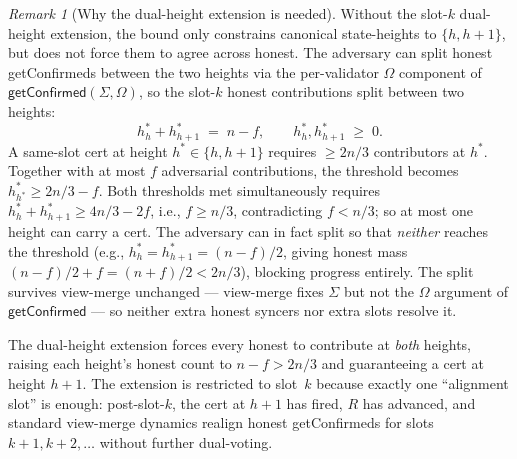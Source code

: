 \ifx\litemode\undefined\documentclass{article}\fi
\newcommand{\getConfirmed}{\textsf{getConfirmed}\xspace}
\theoremstyle{plain}
\theoremstyle{definition}
\theoremstyle{remark}
\newtheorem{remark}[theorem]{Remark}
\begin{document}
\begin{remark}[Why the dual-height extension is needed]\label{rev:rem:dual-vote-needed}
Without the slot-$k$ dual-height extension, the  bound only constrains canonical state-heights to $\{h, h+1\}$, but does not force them to agree across honest. The adversary can split honest \getConfirmed{}s between the two heights via the per-validator $\Omega$ component of $\getConfirmed(\Sigma, \Omega)$, so the slot-$k$ honest contributions split between two heights:
\[
  h^*_h + h^*_{h+1} \;=\; n - f, \qquad h^*_h, h^*_{h+1} \;\geq\; 0.
\]
A same-slot cert at height $h^* \in \{h, h+1\}$ requires $\geq 2n/3$ contributors at $h^*$. Together with at most $f$ adversarial contributions, the threshold becomes $h^*_{h^*} \geq 2n/3 - f$. Both thresholds met simultaneously requires $h^*_h + h^*_{h+1} \geq 4n/3 - 2f$, i.e., $f \geq n/3$, contradicting $f < n/3$; so at most one height can carry a cert. The adversary can in fact split so that \emph{neither} reaches the threshold (e.g., $h^*_h = h^*_{h+1} = (n-f)/2$, giving honest mass $(n-f)/2 + f = (n+f)/2 < 2n/3$), blocking progress entirely. The split survives view-merge unchanged --- view-merge fixes $\Sigma$ but not the $\Omega$ argument of $\getConfirmed$ --- so neither extra honest syncers nor extra slots resolve it.

The dual-height extension forces every honest to contribute at \emph{both} heights, raising each height's honest count to $n - f > 2n/3$ and guaranteeing a cert at height $h+1$. The extension is restricted to slot~$k$ because exactly one ``alignment slot'' is enough: post-slot-$k$, the cert at $h+1$ has fired, $R$ has advanced, and standard view-merge dynamics realign honest \getConfirmed{}s for slots $k+1, k+2, \ldots$ without further dual-voting.
\end{remark}
\end{document}

